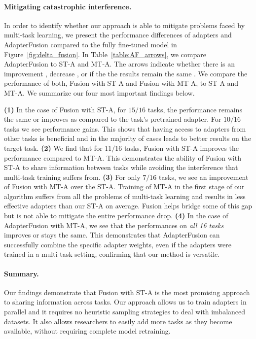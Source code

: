 \paragraph{Mitigating catastrophic interference.} In order to identify whether our approach is able to mitigate problems faced by multi-task learning, we present the performance differences of adapters and AdapterFusion compared to the fully fine-tuned model in Figure~\ref{fig:delta_fusion}.
In Table~\ref{table:AF_arrows}, we compare AdapterFusion to ST-A and MT-A. The arrows indicate whether there is an improvement {\color{col1}\bgroup\contourlength{0.05em}\egroup}, decrease {\color{col3}\bgroup\contourlength{0.05em}\egroup}, or if the the results remain the same {\color{col2}\bgroup\contourlength{0.05em}\egroup}. We compare the performance of  both, Fusion with ST-A and Fusion with MT-A, to ST-A and MT-A. We summarize our four most important findings below.

\textbf{(1)} In the case of Fusion with ST-A, for $15/16$ tasks, the performance remains the same or improves as compared to the task's pretrained adapter. For $10/16$ tasks we see performance gains. This shows that having access to adapters from other tasks is beneficial and in the majority of cases leads to better results on the target task.
\textbf{(2)} We find that for $11/16$ tasks, Fusion with ST-A improves the performance compared to MT-A. This demonstrates the ability of Fusion with ST-A to share information between tasks while avoiding the interference that multi-task training suffers from. 
\textbf{(3)} For only $7/16$ tasks, we see an improvement of Fusion with MT-A over the ST-A. Training of \mbox{MT-A} in the first stage of our algorithm suffers from all the problems of multi-task learning and results in less effective adapters than our ST-A on average. Fusion helps bridge some of this gap but is not able to mitigate the entire performance drop.
\textbf{(4)} In the case of AdapterFusion with MT-A, we see that the performances on \emph{all 16 tasks} improves or stays the same. This demonstrates that AdapterFusion can successfully combine the specific adapter weights, even if the adapters were trained in a multi-task setting,  confirming that our method is  versatile. 

\paragraph{Summary.}
Our findings demonstrate that Fusion with ST-A is the most promising approach to sharing information across tasks. Our approach allows us to train adapters in parallel and it requires no heuristic sampling strategies to deal with imbalanced datasets. It also allows researchers to easily add more tasks as they become available, without requiring complete model retraining. 

